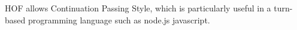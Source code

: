 
HOF allows Continuation Passing Style, which is particularly useful in a turn-based programming language such as node.js javascript.

























